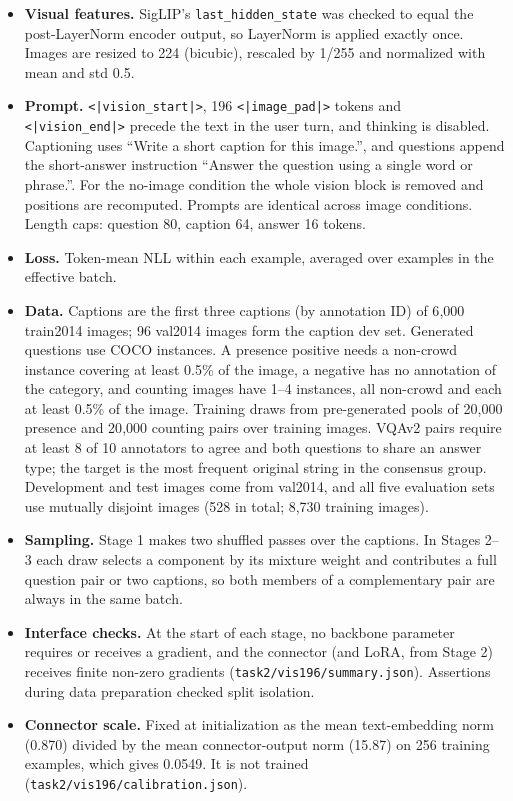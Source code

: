 \documentclass{article}
\begin{document}
\begin{itemize}
\item \textbf{Visual features.} SigLIP's \texttt{last\_hidden\_state} was checked to equal the post-LayerNorm encoder output, so LayerNorm is applied exactly once. Images are resized to 224 (bicubic), rescaled by 1/255 and normalized with mean and std 0.5.
\item \textbf{Prompt.} \texttt{<|vision\_start|>}, 196 \texttt{<|image\_pad|>} tokens and \texttt{<|vision\_end|>} precede the text in the user turn, and thinking is disabled. Captioning uses ``Write a short caption for this image.'', and questions append the short-answer instruction ``Answer the question using a single word or phrase.''. For the no-image condition the whole vision block is removed and positions are recomputed. Prompts are identical across image conditions. Length caps: question 80, caption 64, answer 16 tokens.
\item \textbf{Loss.} Token-mean NLL within each example, averaged over examples in the effective batch.
\item \textbf{Data.} Captions are the first three captions (by annotation ID) of 6{,}000 train2014 images; 96 val2014 images form the caption dev set. Generated questions use COCO instances. A presence positive needs a non-crowd instance covering at least 0.5\% of the image, a negative has no annotation of the category, and counting images have 1--4 instances, all non-crowd and each at least 0.5\% of the image. Training draws from pre-generated pools of 20{,}000 presence and 20{,}000 counting pairs over training images. VQAv2 pairs require at least 8 of 10 annotators to agree and both questions to share an answer type; the target is the most frequent original string in the consensus group. Development and test images come from val2014, and all five evaluation sets use mutually disjoint images (528 in total; 8{,}730 training images).
\item \textbf{Sampling.} Stage 1 makes two shuffled passes over the captions. In Stages 2--3 each draw selects a component by its mixture weight and contributes a full question pair or two captions, so both members of a complementary pair are always in the same batch.
\item \textbf{Interface checks.} At the start of each stage, no backbone parameter requires or receives a gradient, and the connector (and LoRA, from Stage 2) receives finite non-zero gradients (\texttt{task2/vis196/summary.json}). Assertions during data preparation checked split isolation.
\item \textbf{Connector scale.} Fixed at initialization as the mean text-embedding norm (0.870) divided by the mean connector-output norm (15.87) on 256 training examples, which gives 0.0549. It is not trained (\texttt{task2/vis196/calibration.json}).

\end{itemize}
\end{document}
